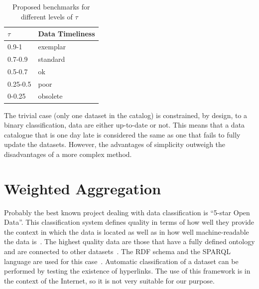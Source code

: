 \begin{table}[htbp]
    \centering

    \begin{tabular}{@{}ll@{}}
        \toprule
        \( \tau \)  & Data Timeliness   \\ \midrule
        0.9-1       & exemplar          \\
        0.7-0.9     & standard          \\
        0.5-0.7     & ok                \\
        0.25-0.5    & poor              \\
        0-0.25      & obsolete          \\
        \bottomrule
    \end{tabular}

    \caption{Proposed benchmarks for different levels of \( \tau \)~\cite{atz2014tau}}
    \label{table:timeliness-benchmarks}
\end{table}
\FloatBarrier

The trivial case (only one dataset in the catalog) is constrained, by design, to a binary classification, data are either up-to-date or not.
This means that a data catalogue that is one day late is considered the same as one that fails to fully update the datasets.
However, the advantages of simplicity outweigh the disadvantages of a more complex method.

\section{Weighted Aggregation}

Probably the best known project dealing with data classification is \enquote{5-star Open Data}.
This classification system defines quality in terms of how well they provide the context in which the data is located as well as in how well machine-readable the data is~\cite{w3org5stardata}.
The highest quality data are those that have a fully defined ontology and are connected to other datasets~\cite{5stardata}.
The RDF schema and the SPARQL language are used for this case~\cite{5stardata}.
Automatic classification of a dataset can be performed by testing the existence of hyperlinks.
The use of this framework is in the context of the Internet, so it is not very suitable for our purpose.

